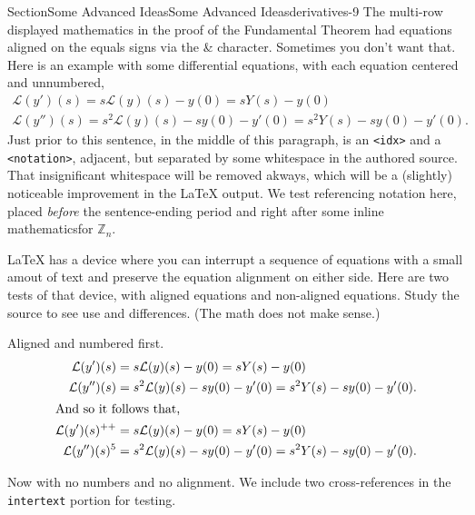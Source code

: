 \documentclass[twoside,10pt,]{article}
\newcommand{\mono}[1]{\texttt{#1}}
\numberwithin{equation}{section}
\begin{document}
\begin{sectionptx}{Section}{Some Advanced Ideas}{}{Some Advanced Ideas}{}{}{derivatives-9}
The multi-row displayed mathematics in the proof of the Fundamental Theorem had equations aligned on the equals signs via the \& character.  Sometimes you don't want that.  Here is an example with some differential equations, with each equation centered and unnumbered,%
\begin{gather*}
{\mathcal L}(y')(s) = s {\mathcal L}(y)(s) - y(0) = s Y(s) - y(0)\\
{\mathcal L}(y'')(s) = s^2 {\mathcal L}(y)(s) - sy(0) - y'(0)= s^2 Y(s) - sy(0) - y'(0)\text{.}
\end{gather*}
\label{derivatives-9-2-3} Just prior to this sentence, in the middle of this paragraph, is an \mono{<idx>} and a \mono{<notation>}, adjacent, but separated by some whitespace in the authored source.  That insignificant whitespace will be removed akways, which will be a (slightly) noticeable improvement in the \LaTeX{} output.  We test referencing notation here, placed \emph{before} the sentence-ending period and right after some inline mathematics\textemdash{}for \(\mathbb{Z}_n\)\label{derivatives-9-2-11}.%
\par
\LaTeX{} has a device where you can interrupt a sequence of equations with a small amout of text and preserve the equation alignment on either side.  Here are two tests of that device, with aligned equations and non-aligned equations.  Study the source to see use and differences.  (The math does not make sense.)%
\par
Aligned and numbered first.%
\begin{align}
{\mathcal L}(y')(s)  &= s {\mathcal L}(y)(s) - y(0) = s Y(s) - y(0)\label{derivatives-9-4-1-1}\\
{\mathcal L}(y'')(s) &= s^2 {\mathcal L}(y)(s) - sy(0) - y'(0)= s^2 Y(s) - sy(0) - y'(0).\label{derivatives-9-4-1-2}\\
\intertext{And so it follows that,}
{\mathcal L}(y')(s)^{++}  &= s {\mathcal L}(y)(s) - y(0) = s Y(s) - y(0)\label{derivatives-9-4-1-4}\\
{\mathcal L}(y'')(s)^{5} &= s^2 {\mathcal L}(y)(s) - sy(0) - y'(0)= s^2 Y(s) - sy(0) - y'(0).\label{derivatives-9-4-1-5}
\end{align}
%
\par
Now with no numbers and no alignment.  We include two cross-references in the \mono{intertext} portion for testing.%
\begin{gather*}

\end{gather*}
\end{sectionptx}
\end{document}
